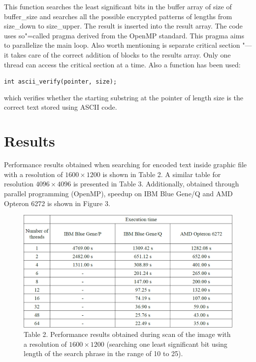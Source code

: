 \documentclass[10pt, a5paper]{article}
\begin{document}
This function searches the least significant bits in the buffer array of size of buffer\_size and searches all the possible encrypted patterns of lengths from size\_down to size\_upper. The result is inserted into the result array. The code uses so"=called pragma derived from the OpenMP standard. This pragma aims to parallelize the main loop. Also worth mentioning is separate critical section "--- it takes care of the correct addition of blocks to the results array. Only one thread can access the critical section at a time. Also a function has been used:

\verb!int ascii_verify(pointer, size);!

which verifies whether the starting substring at the pointer of length size is the correct text stored using ASCII code.

\section{Results}

Performance results obtained when searching for encoded text inside graphic file with a resolution of $1600\times1200$ is shown in Table 2. A similar table for resolution $4096\times4096$ is presented in Table 3. Additionally, obtained through parallel programming (OpenMP), speedup on IBM Blue Gene/Q and AMD Opteron 6272 is shown in Figure 3.


\begin{figure}[h!]
  \centering
  \includegraphics[width=\textwidth]{103_2014_w_Kwiatkowska_time2.png}
  Table 2. Performance results obtained during scan of the image with a resolution of $1600\times1200$ (searching one least significant bit using length of the search phrase in the range of 10 to 25).
\end{figure}
\end{document}
